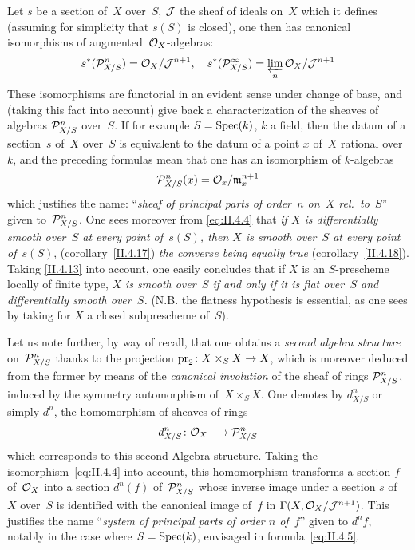 \begin{remarks}
Let $s$ be a section of~$X$ over~$S$, $\cal{J}$ the sheaf
of ideals on~$X$ which it defines (assuming
for simplicity that $s(S)$ is closed), one then has
canonical isomorphisms of augmented~$\cal{O}_X$-algebras:
\begin{equation}
\label{eq:II.4.4}
s^*(\cal{P}_{X/S}^n)=\cal{O}_X/\cal{J}^{n+1}\quoi,\quad
s^*(\cal{P}_{X/S}^{\infty})= \varprojlim_{n}
\cal{O}_X/\cal{J}^{n+1}
\end{equation}
These isomorphisms are functorial in an evident sense under
change of base, and (taking this fact into account) give back a
characterization of the sheaves of algebras $\cal{P}_{X/S}^n$ over~$S$. If for example $S=\Spec(k)$, $k$ a field, then the datum
of a section~$s$ of~$X$ over~$S$ is equivalent to the datum of a
point $x$ of~$X$ rational over~$k$, and the
preceding formulas mean that one has an isomorphism of
$k$-algebras
\begin{equation}
\label{eq:II.4.5}
\cal{P}_{X/S}^n(x)=\cal{O}_x/\goth{m}_x^{n+1}
\end{equation}
which justifies the name: ``\emph{sheaf of principal parts
of order~$n$ on~$X$ rel.\ to~$S$}''
given to~$\cal{P}_{X/S}^n$. One sees moreover from
\eqref{eq:II.4.4} that \emph{if $X$ is differentially smooth
over~$S$ at every point of~$s(S)$, then $X$ is smooth over~$S$ at every
point of~$s(S)$}, (corollary~\ref{II.4.17}) \emph{the converse
being equally true} (corollary~\ref{II.4.18}). Taking
\ref{II.4.13} into account, one easily concludes that if $X$ is an
$S$-prescheme locally of finite type, \emph{$X$ is smooth over~$S$ if and only if it is flat over~$S$ and differentially
smooth over~$S$.} (N.B. the flatness hypothesis is essential,
as one sees by taking for $X$ a closed subprescheme
of~$S$).

Let us note further, by way of recall, that one obtains a
\emph{second algebra structure} on~$\cal{P}_{X/S}^n$
thanks to the projection $\pr_2\colon X\times_S X\to X$,
which is moreover deduced from the former by means of
the \emph{canonical involution} of the sheaf of rings $\cal{P}_{X/S}^n$,
induced by the symmetry automorphism of~$X\times_S X$. One denotes
by $d_{X/S}^n$
or simply $d^n$, the homomorphism of sheaves of rings
\begin{equation}
\label{eq:II.4.6}
d_{X/S}^n\colon \cal{O}_X\to\cal{P}_{X/S}^n
\end{equation}
which corresponds to this second
Algebra structure. Taking the isomorphism~\eqref{eq:II.4.4} into account, this
homomorphism transforms a section $f$ of~$\cal{O}_X$ into a section
$d^n(f)$ of~$\cal{P}_{X/S}^n$ whose inverse image under a section $s$
of~$X$ over~$S$ is identified with the canonical image of~$f$ in
$\Gamma(X,\cal{O}_X/\cal{J}^{n+1})$. This justifies the name
``\emph{system of principal parts of order $n$ of~$f$}''
given to $d^nf$, notably in the case where $S=\Spec(k)$,
envisaged in formula~\eqref{eq:II.4.5}.


\end{remarks}
